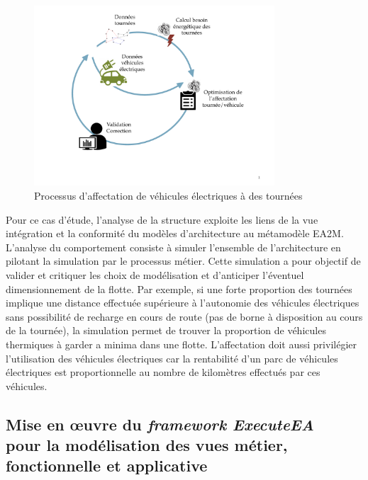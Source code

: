     \begin{figure}[!htbp]
     \begin{center}
      \includegraphics[trim=0cm 3cm 0cm 0cm, width=0.8\textwidth]{figures/5_implementation/processus_metier.pdf}
     \end{center}
     \caption{Processus d'affectation de véhicules électriques à des tournées}
     \label{fig:processus_metier}
    \end{figure}

    Pour ce cas d'étude, l'analyse de la structure exploite les liens de la vue
    intégration et la conformité du modèles d'architecture au métamodèle EA2M.
    L'analyse du comportement consiste à simuler l'ensemble de l'architecture en
    pilotant la simulation par le processus métier. Cette simulation a pour
    objectif de valider et critiquer  les choix de modélisation et d'anticiper
    l'éventuel dimensionnement de la flotte. Par exemple, si une forte
    proportion des tournées implique une distance effectuée supérieure à
    l'autonomie des véhicules électriques sans possibilité de recharge en cours
    de route (pas de borne à disposition au cours de la tournée), la simulation
    permet  de trouver la proportion de véhicules thermiques à garder a minima
    dans une flotte. L'affectation doit aussi privilégier l'utilisation des
    véhicules électriques car la rentabilité d'un parc de véhicules électriques
    est proportionnelle au nombre de kilomètres effectués par ces véhicules.

    \subsection{Mise en œuvre du \emph{framework ExecuteEA}\\
    pour la modélisation des vues métier, fonctionnelle et applicative}

